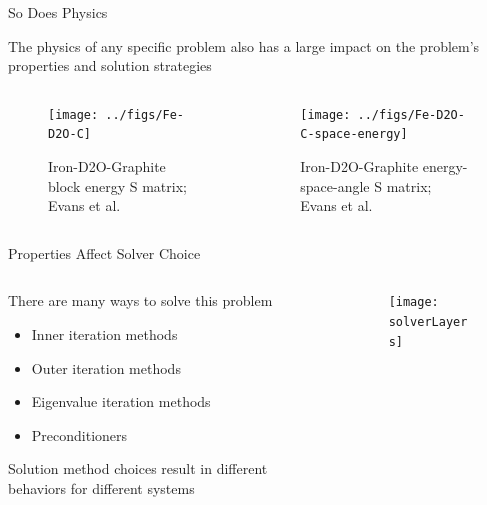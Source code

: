 \documentclass[xcolor=x11names,compress]{beamer}
\renewcommand{\(}{\begin{columns}}
\renewcommand{\)}{\end{columns}}
\newcommand{\<}[1]{\begin{column}{#1}}
\renewcommand{\>}{\end{column}}
\begin{document}
\begin{frame}{So Does Physics}

    The physics of any specific problem also has a large impact on the
    problem's properties and solution strategies
    
    \begin{columns}
    \begin{column}{0.45\textwidth}
 	   \begin{center}
 	   \begin{figure}
 	   \texttt{[image: ../figs/Fe-D2O-C]}
 	   \caption{Iron-D2O-Graphite block energy S matrix; Evans et al.}
       \end{figure}
 	   \end{center}
  	\end{column}
 	\begin{column}{0.45\textwidth}
 	   \begin{center}
 	   \begin{figure}
 	   \texttt{[image: ../figs/Fe-D2O-C-space-energy]}
 	   \caption{Iron-D2O-Graphite energy-space-angle S matrix; Evans et al.}
       \end{figure}
 	   \end{center}
  	\end{column}
	\end{columns}
       
\end{frame}

\begin{frame}{Properties Affect Solver Choice}

    \begin{columns}
    \begin{column}{0.45\textwidth}
        There are many ways to \textcolor{dgreen}{solve} this problem
        \begin{itemize}
        \item Inner iteration methods
        \item Outer iteration methods
        \item Eigenvalue iteration methods
        \item Preconditioners
        \end{itemize}
    
        \textcolor{dgreen}{Solution} method choices result in different
        behaviors for different systems
  	\end{column}
 	\begin{column}{0.45\textwidth}
 	   \begin{center}
 	   \begin{figure}
 	   \texttt{[image: solverLayers]}
       \end{figure}
 	   \end{center}
  	\end{column}
	\end{columns}
	
\end{frame}
\end{document}
